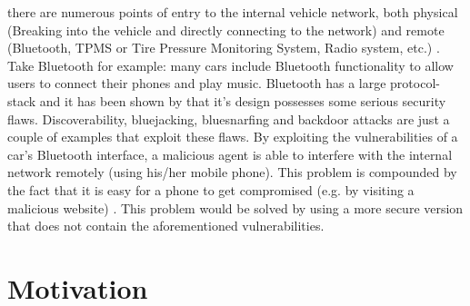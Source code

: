 there are numerous points of entry to the internal vehicle network, both physical (Breaking into the vehicle and directly connecting to the network) and remote (Bluetooth, TPMS or Tire Pressure Monitoring System, Radio system, etc.) \cite{MillerA}. Take Bluetooth for example: many cars include Bluetooth functionality to allow users to connect their phones and play music. Bluetooth has a large protocol-stack and it has been shown by \cite{Bluetooth} that it's design possesses some serious security flaws. Discoverability, bluejacking, bluesnarfing and backdoor attacks are just a couple of examples that exploit these flaws. By exploiting the vulnerabilities of a car's Bluetooth interface, a malicious agent is able to interfere with the internal network remotely (using his/her mobile phone). This problem is compounded by the fact that it is easy for a phone to get compromised (e.g. by visiting a malicious website) \cite{Yadav16}. This problem would be solved by using a more secure version that does not contain the aforementioned vulnerabilities.



\section{Motivation}
\label{sec:motivation}

